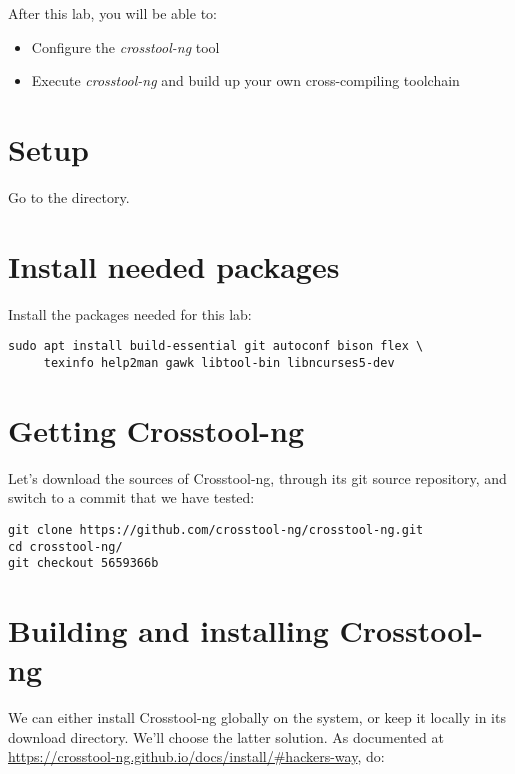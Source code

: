 
After this lab, you will be able to:

\begin{itemize}
\item Configure the {\em crosstool-ng} tool
\item Execute {\em crosstool-ng} and build up your own cross-compiling toolchain
\end{itemize}

\section{Setup}

Go to the  directory.

\section{Install needed packages}

Install the packages needed for this lab:

\begin{verbatim}
sudo apt install build-essential git autoconf bison flex \
     texinfo help2man gawk libtool-bin libncurses5-dev
\end{verbatim}

\section{Getting Crosstool-ng}

Let's download the sources of Crosstool-ng, through its git
source repository, and switch to a commit that we have tested:

\begin{verbatim}
git clone https://github.com/crosstool-ng/crosstool-ng.git
cd crosstool-ng/
git checkout 5659366b
\end{verbatim}

\section{Building and installing Crosstool-ng}

We can either install Crosstool-ng globally on the system, or keep it
locally in its download directory. We'll choose the latter
solution. As documented at
\url{https://crosstool-ng.github.io/docs/install/#hackers-way}, do:

